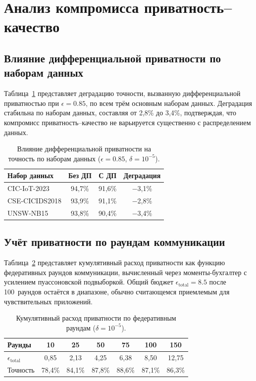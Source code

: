 \section{Анализ компромисса приватность--качество}
\label{app:privacy_utility}

\subsection{Влияние дифференциальной приватности по наборам данных}
\label{app:dp_impact}

Таблица~\ref{tab:app_dp_datasets} представляет деградацию точности, вызванную дифференциальной приватностью при $\epsilon=0.85$, по всем трём основным наборам данных. Деградация стабильна по наборам данных, составляя от 2,8\% до 3,4\%, подтверждая, что компромисс приватность--качество не варьируется существенно с распределением данных.

\begin{table}[htbp]
\centering
\caption{Влияние дифференциальной приватности на точность по наборам данных ($\epsilon=0.85$, $\delta=10^{-5}$).}
\label{tab:app_dp_datasets}
\begin{tabular}{lccc}
\toprule
Набор данных & Без ДП & С ДП & Деградация \\
\midrule
CIC-IoT-2023   & 94,7\% & 91,6\% & $-$3,1\% \\
CSE-CICIDS2018 & 93,9\% & 91,1\% & $-$2,8\% \\
UNSW-NB15      & 93,8\% & 90,4\% & $-$3,4\% \\
\bottomrule
\end{tabular}
\end{table}


\subsection{Учёт приватности по раундам коммуникации}
\label{app:privacy_accounting}

Таблица~\ref{tab:app_privacy_rounds} представляет кумулятивный расход приватности как функцию федеративных раундов коммуникации, вычисленный через моменты-бухгалтер с усилением пуассоновской подвыборкой. Общий бюджет $\epsilon_{\mathrm{total}}=8.5$ после 100~раундов остаётся в диапазоне, обычно считающемся приемлемым для чувствительных приложений.

\begin{table}[htbp]
\centering
\caption{Кумулятивный расход приватности по федеративным раундам ($\delta=10^{-5}$).}
\label{tab:app_privacy_rounds}
\begin{tabular}{lcccccc}
\toprule
Раунды & 10 & 25 & 50 & 75 & 100 & 150 \\
\midrule
$\epsilon_{\mathrm{total}}$ & 0,85 & 2,13 & 4,25 & 6,38 & 8,50 & 12,75 \\
Точность & 78,4\% & 84,1\% & 87,8\% & 88,6\% & 87,1\% & 86,3\% \\
\bottomrule
\end{tabular}
\end{table}



